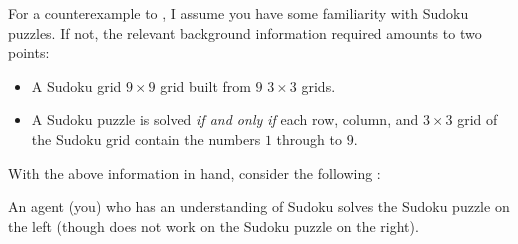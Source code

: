 \begin{note}
  For a counterexample to \issueInclusion{}, I assume you have some familiarity with Sudoku puzzles.
  If not, the relevant background information required amounts to two points:
  \begin{itemize}
  \item
    A Sudoku grid \(9 \times 9\) grid built from \(9\) \(3 \times 3\) grids.
  \item
    A Sudoku puzzle is solved \emph{if and only if} each row, column, and \(3 \times 3\) grid of the Sudoku grid contain the numbers \(1\) through to \(9\).
  \end{itemize}
  With the above information in hand, consider the following :

  \begin{scenario}%
    \label{illu:gist:sudoku}%
    An agent (you) who has an understanding of Sudoku solves the Sudoku puzzle on the left (though does not work on the Sudoku puzzle on the right).
    \bigskip


\end{scenario}
\end{note}
